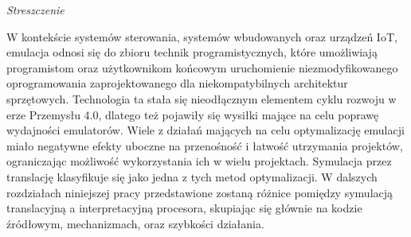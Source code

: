 \documentclass[english,bachelor,a4paper,oneside]{ppfcmthesis}
\begin{document}
\begin{vplace}

\begin{center}
   \huge{\textit{Streszczenie}}
\end{center}

W kontekście systemów sterowania, systemów wbudowanych oraz urządzeń IoT, emulacja odnosi się do zbioru technik
programistycznych, które umożliwiają programistom oraz użytkownikom końcowym uruchomienie niezmodyfikowanego
oprogramowania zaprojektowanego dla niekompatybilnych architektur sprzętowych. Technologia ta stała się nieodłącznym
elementem cyklu rozwoju w erze Przemysłu 4.0, dlatego też pojawiły się wysiłki mające na celu poprawę wydajności
emulatorów. Wiele z działań mających na celu optymalizację emulacji miało negatywne efekty uboczne na przenośność i
łatwość utrzymania projektów, ograniczając możliwość wykorzystania ich w wielu projektach. Symulacja przez translację
klasyfikuje się jako jedna z tych metod optymalizacji. W dalszych rozdziałach niniejszej pracy przedstawione zostaną
różnice pomiędzy symulacją translacyjną a interpretacyjną procesora, skupiając się głównie na kodzie źródłowym,
mechanizmach, oraz szybkości działania.

\end{vplace}

\newpage


\pagestyle{ppfcmthesis}%
\tableofcontents* 
\cleardoublepage %


\mainmatter%









{\raggedright\sloppy\small}


\cleardoublepage\appendix%
\newpage
\if



\ppcolophon
\end{document}
